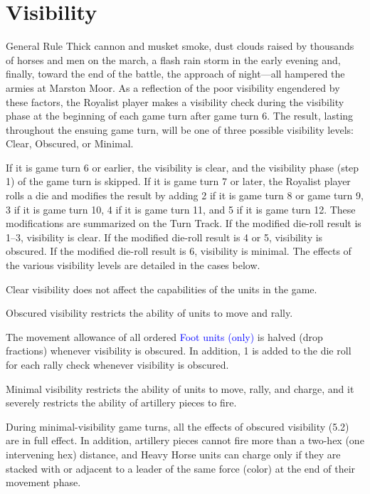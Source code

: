 \section{Visibility}

\begin{rulebox}{General Rule}
Thick cannon and musket smoke, dust clouds raised by thousands of horses and men on the march, a flash rain storm in the early evening and, finally, toward the end of the battle, the approach of night---all hampered the armies at Marston Moor. As a reflection of the poor visibility engendered by these factors, the Royalist player makes a visibility check during the visibility phase at the beginning of each game turn after game turn 6. The result, lasting throughout the ensuing game turn, will be one of three possible visibility levels: Clear, Obscured, or Minimal.
\end{rulebox}


If it is game turn 6 or earlier, the visibility is clear, and the visibility phase (step 1) of the game turn is skipped. If it is game turn 7 or later, the Royalist player rolls a die and modifies the result by adding 2 if it is game turn 8 or game turn 9, 3 if it is game turn 10, 4 if it is game turn 11, and 5 if it is game turn 12. These modifications are summarized on the Turn Track. If the modified die-roll result is 1--3, visibility is clear. If the modified die-roll result is 4 or 5, visibility is obscured. If the modified die-roll result is 6, visibility is minimal. The effects of the various visibility levels are detailed in the cases below.

 Clear visibility does not affect the capabilities of the units in the game.

 Obscured visibility restricts the ability of units to move and rally.

The movement allowance of all ordered \textcolor{blue}{Foot units (only)} is halved (drop fractions) whenever visibility is obscured. In addition, 1 is added to the die roll for each rally check whenever visibility is obscured.

 Minimal visibility restricts the ability of units to move, rally, and charge, and it severely restricts the ability of artillery pieces to fire.

During minimal-visibility game turns, all the effects of obscured visibility (5.2) are in full effect. In addition, artillery pieces cannot fire more than a two-hex (one intervening hex) distance, and Heavy Horse units can charge only if they are stacked with or adjacent to a leader of the same force (color) at the end of their movement phase.

